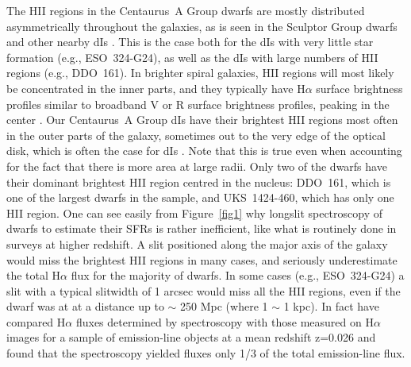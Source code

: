 \documentclass[preprint]{aastex}
\begin{document}
The HII regions in the Centaurus~A Group dwarfs are mostly distributed asymmetrically
throughout the galaxies, as is seen in the Sculptor Group dwarfs \citep{scm03a} 
and other nearby dIs \citep{bha98, vz00}.
This is the case both for the dIs with very little star formation
(e.g., ESO~324-G24), as well as the dIs with large numbers of HII regions 
(e.g., DDO~161). In brighter spiral galaxies, HII regions will
most likely be concentrated in the inner parts, and they typically have H$\alpha$ 
surface brightness profiles similar to broadband V or R surface brightness profiles,
peaking in the center \citet{kk06}. 
Our Centaurus~A Group dIs have  
their brightest HII regions most often in the outer parts of
the galaxy, sometimes out to the very edge of the optical disk, which is often
the case for dIs \citet{bha98}. Note that this is true even when accounting for the fact
that there is more area at large radii. Only two
of the dwarfs have their dominant brightest HII region centred in the
nucleus: DDO~161, which is one of the largest dwarfs in the sample, and
UKS~1424-460, which has only one HII region. One can see easily from
Figure~\ref{fig1} why longslit spectroscopy of dwarfs to estimate their SFRs
is rather inefficient, like what is routinely done in surveys at higher redshift.
A slit positioned along the major axis of the galaxy would miss the
brightest HII regions in many cases, and seriously underestimate the 
total H$\alpha$ flux for the majority of dwarfs. In some cases (e.g., ESO~324-G24)
a slit with a typical slitwidth of 1 arcsec would  miss all 
the HII regions, even if the dwarf was at at a distance up to $\sim $ 250 Mpc 
(where 1 \arcsec $\sim$ 1 kpc). In fact \citet{pg03} have compared H$\alpha$ fluxes 
determined by spectroscopy with those measured on H$\alpha$ images for a sample
of emission-line objects at a mean redshift z=0.026 and found that the spectroscopy
yielded fluxes only 1/3 of the total emission-line flux.
\end{document}
